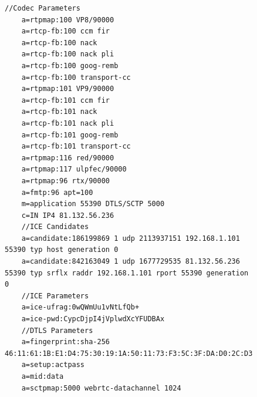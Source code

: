\documentclass[]{report}
\begin{document}
\begin{figure}[h!]
\begin{lstlisting}[tabsize=1,frame=single, basicstyle=\ttfamily\footnotesize, breaklines=true]
	//Codec Parameters
	a=rtpmap:100 VP8/90000
	a=rtcp-fb:100 ccm fir
	a=rtcp-fb:100 nack
	a=rtcp-fb:100 nack pli
	a=rtcp-fb:100 goog-remb
	a=rtcp-fb:100 transport-cc
	a=rtpmap:101 VP9/90000
	a=rtcp-fb:101 ccm fir
	a=rtcp-fb:101 nack
	a=rtcp-fb:101 nack pli
	a=rtcp-fb:101 goog-remb
	a=rtcp-fb:101 transport-cc
	a=rtpmap:116 red/90000
	a=rtpmap:117 ulpfec/90000
	a=rtpmap:96 rtx/90000
	a=fmtp:96 apt=100
	m=application 55390 DTLS/SCTP 5000
	c=IN IP4 81.132.56.236
	//ICE Candidates
	a=candidate:186199869 1 udp 2113937151 192.168.1.101 55390 typ host generation 0
	a=candidate:842163049 1 udp 1677729535 81.132.56.236 55390 typ srflx raddr 192.168.1.101 rport 55390 generation 0
	//ICE Parameters
	a=ice-ufrag:0wQWmUu1vNtLfQb+
	a=ice-pwd:CypcDjpI4jVplwdXcYFUDBAx
	//DTLS Parameters
	a=fingerprint:sha-256 46:11:61:1B:E1:D4:75:30:19:1A:50:11:73:F3:5C:3F:DA:D0:2C:D3:6F:E3:CE:EB:1E:13:94:12:00:71:51:60
	a=setup:actpass
	a=mid:data
	a=sctpmap:5000 webrtc-datachannel 1024
	\end{lstlisting}	
\end{figure}
\end{document}
